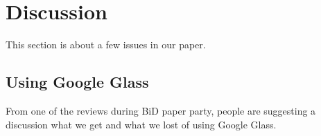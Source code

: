 \section{Discussion}
\label{sec:discussion}

This section is about a few issues in our paper.

\subsection{Using Google Glass}
\label{sec:using-google-glass}
From one of the reviews during BiD paper party, people are suggesting a discussion what we get and what we lost of using Google Glass.


